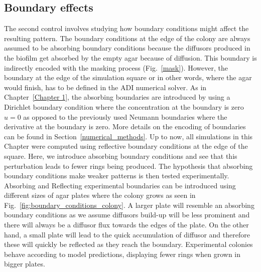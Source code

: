 \subsection{Boundary effects}
The second control involves studying how boundary conditions might affect the resulting pattern.
The boundary conditions at the edge of the colony are always assumed to be absorbing boundary conditions because the diffusors produced in the biofilm get absorbed by the empty agar because of diffusion.
This boundary is indirectly encoded with the masking process (Fig.~\ref{mask}).
However, the boundary at the edge of the simulation square or in other words, where the agar would finish, has to be defined in the ADI numerical solver.
As in Chapter~\ref{Chapter 1}, the absorbing boundaries are introduced by using a Dirichlet boundary condition where the concentration at the boundary is zero $u=0$ as opposed to the previously used Neumann boundaries where the derivative at the boundary is zero.
More details on the encoding of boundaries can be found in Section~\ref{numerical_methods}.
Up to now, all simulations in this Chapter were computed using reflective boundary conditions at the edge of the square.
Here, we introduce absorbing boundary conditions and see that this perturbation leads to fewer rings being produced.
The hypothesis that absorbing boundary conditions make weaker patterns is then tested experimentally.
Absorbing and Reflecting experimental boundaries can be introduced using different sizes of agar plates where the colony grows as seen in Fig.~\ref{fig:boundary_conditions_colony}.
A larger plate will resemble an absorbing boundary conditions as we assume diffusors build-up will be less prominent and there will always be a diffusor flux towards the edges of the plate.
On the other hand, a small plate will lead to the quick accumulation of diffusor and therefore these will quickly be reflected as they reach the boundary.
Experimental colonies behave according to model predictions, displaying fewer rings when grown in bigger plates.


